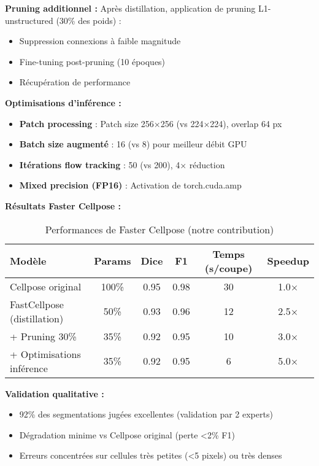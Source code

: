 \textbf{Pruning additionnel :}
Après distillation, application de pruning L1-unstructured (30\% des poids) :
\begin{itemize}
    \item Suppression connexions à faible magnitude
    \item Fine-tuning post-pruning (10 époques)
    \item Récupération de performance
\end{itemize}

\textbf{Optimisations d'inférence :}
\begin{itemize}
    \item \textbf{Patch processing} : Patch size 256×256 (vs 224×224), overlap 64 px
    \item \textbf{Batch size augmenté} : 16 (vs 8) pour meilleur débit GPU
    \item \textbf{Itérations flow tracking} : 50 (vs 200), 4× réduction
    \item \textbf{Mixed precision (FP16)} : Activation de torch.cuda.amp
\end{itemize}

\textbf{Résultats Faster Cellpose :}
\begin{table}[h]
\centering
\caption{Performances de Faster Cellpose (notre contribution)}
\begin{tabular}{lccccc}
\toprule
\textbf{Modèle} & \textbf{Params} & \textbf{Dice} & \textbf{F1} & \textbf{Temps (s/coupe)} & \textbf{Speedup} \\
\midrule
Cellpose original & 100\% & 0.95 & 0.98 & 30 & 1.0× \\
FastCellpose (distillation) & 50\% & 0.93 & 0.96 & 12 & 2.5× \\
+ Pruning 30\% & 35\% & 0.92 & 0.95 & 10 & 3.0× \\
+ Optimisations inférence & 35\% & 0.92 & 0.95 & 6 & 5.0× \\
\bottomrule
\end{tabular}
\end{table}

\textbf{Validation qualitative :}
\begin{itemize}
    \item 92\% des segmentations jugées excellentes (validation par 2 experts)
    \item Dégradation minime vs Cellpose original (perte <2\% F1)
    \item Erreurs concentrées sur cellules très petites (<5 pixels) ou très denses
\end{itemize}

